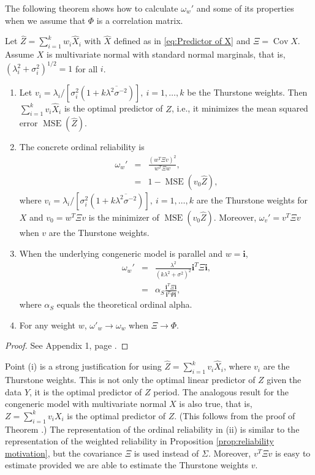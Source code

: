 \documentclass[twoside]{article}
\DeclareMathOperator{\Cov}{Cov}
\DeclareMathOperator{\MSE}{MSE}
\renewcommand{\sqrt}[1]{{(#1)^{1/2}}}
\begin{document}
The following theorem shows how to calculate $\omega_{w}'$ and
some of its properties when we assume that $\Phi$ is a correlation matrix.
\begin{thm}
\label{thm:omega-prime}Let $\hat{Z}=\sum_{i=1}^{k}w_{i}\hat{X}_{i}$
with $\hat{X}$ defined as in \eqref{eq:Predictor of X} and $\Xi=\Cov\hat{X}$.
Assume $X$ is multivariate normal with standard normal marginals,
that is, $\sqrt{\lambda_{i}^{2}+\sigma_{i}^{2}}=1$ for all $i$.
\begin{enumerate}[label=(\roman*)]
\item Let  $v_{i}=\lambda_{i}/[\sigma_{i}^{2}(1+k\overline{\lambda^{2}\sigma^{-2}})],\:i=1,\ldots,k$ be the Thurstone weights. Then $\sum_{i=1}^{k}v_{i}\hat{X}_{i}$
is the optimal predictor of $Z$, i.e., it minimizes the mean squared
error $\MSE(\hat{Z})$.
\item The concrete ordinal reliability is
\begin{eqnarray}
\omega_{w}' & = & \frac{(w^{T}\Xi v)^{2}}{w^{T}\Xi w},\label{eq:Omega prime}\\
 & = & 1-\MSE(v_{0}\hat{Z}),\nonumber 
\end{eqnarray}
where $v_{i}=\lambda_{i}/[\sigma_{i}^{2}(1+k\overline{\lambda^{2}\sigma^{-2}})],\:i=1,\ldots,k$
are the Thurstone weights for $X$ and $v_{0}=w^{T}\Xi v$ is the
minimizer of $\MSE(v_{0}\hat{Z})$. Moreover, $\omega_{v}'=v^{T}\Xi v$ when $v$
are the Thurstone weights.
\item When the underlying congeneric model is parallel and $w=\mathbf{i}$,
\begin{eqnarray}
\omega_{w}' & = & \frac{\lambda^{2}}{(k\lambda^{2}+\sigma^{2})^{2}}\mathbf{i}^{T}\Xi\mathbf{i},\label{eq:Alpha prime}\\
 & = & \alpha_S\frac{\mathbf{i}^{T}\Xi\mathbf{i}}{\mathbf{i}^{T}\Psi\mathbf{i}},\nonumber 
\end{eqnarray}
where $\alpha_S$ equals the theoretical ordinal alpha.
\item For any weight $w$, $\omega'_{w}\to\omega_{w}$ when $\Xi\to\Phi$. 
\end{enumerate}
\end{thm}

\begin{proof}
See Appendix 1, page \pageref{proof:omega-prime}.
\end{proof}
Point (i) is a strong justification for using $\hat{Z}=\sum_{i=1}^{k}v_{i}\hat{X}_{i}$,
where $v_{i}$ are the Thurstone weights. This is not only the optimal
linear predictor of $Z$ given the data $Y$, it is the optimal predictor
of $Z$ period. The analogous result for the congeneric model with
multivariate normal $X$ is also true, that is, $Z=\sum_{i=1}^{k}v_{i}X_{i}$
is the optimal predictor of $Z$. (This follows from the proof of
Theorem \pageref{thm:omega-prime}.) The representation of the ordinal
reliability in (ii) is similar to the representation of the weighted
reliability in Proposition \ref{prop:reliability motivation}, but the covariance $\Xi$ is used
instead of $\Sigma$. Moreover, $v^{T}\Xi v$ is easy to estimate
provided we are able to estimate the Thurstone weights $v$. 
\end{document}
